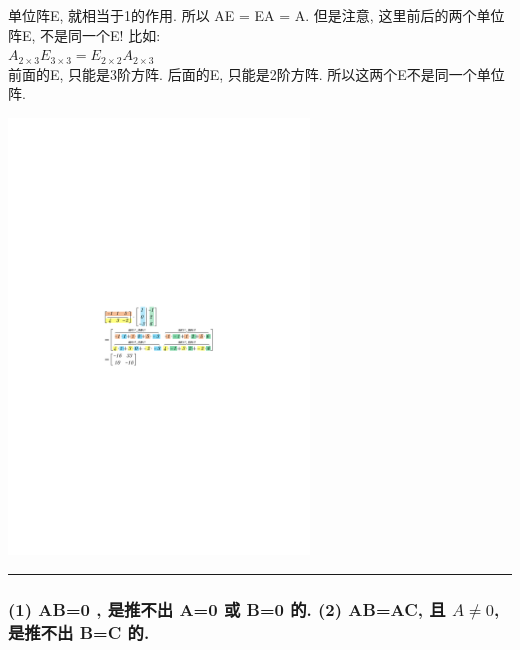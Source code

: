 \documentclass[UTF8]{ctexart}
\begin{document}
单位阵E, 就相当于1的作用. 所以 AE = EA = A. 但是注意, 这里前后的两个单位阵E, 不是同一个E!  比如: \\
$A_{2×3}E_{3×3}=E_{2×2}A_{2×3}$\\
前面的E, 只能是3阶方阵. 后面的E, 只能是2阶方阵. 所以这两个E不是同一个单位阵. \\







\begin{myEnvSample}
\includegraphics[width=0.6\textwidth]{img/0017.pdf}
\end{myEnvSample}

\hrule

\subsubsection{(1) AB=0 , 是推不出 A=0 或 B=0 的. (2) AB=AC, 且 $A \neq 0 $, 是推不出 B=C 的.}
\end{document}
